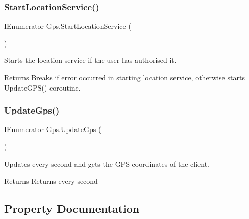 \mbox{\label{class_gps_aa67e567c766cc77fa070956e39ff9f73}} 
\subsubsection{\texorpdfstring{StartLocationService()}{StartLocationService()}}
{\footnotesize\ttfamily I\+Enumerator Gps.\+Start\+Location\+Service (\begin{DoxyParamCaption}{ }\end{DoxyParamCaption})\hspace{0.3cm}{\ttfamily [private]}}



Starts the location service if the user has authorised it. 

\begin{DoxyReturn}{Returns}
Breaks if error occurred in starting location service, otherwise starts Update\+G\+P\+S() coroutine.
\end{DoxyReturn}
\mbox{\label{class_gps_a6e153f3ff7ee313f35978f0484872f30}} 
\subsubsection{\texorpdfstring{UpdateGps()}{UpdateGps()}}
{\footnotesize\ttfamily I\+Enumerator Gps.\+Update\+Gps (\begin{DoxyParamCaption}{ }\end{DoxyParamCaption})\hspace{0.3cm}{\ttfamily [private]}}



Updates every second and gets the G\+PS coordinates of the client. 

\begin{DoxyReturn}{Returns}
Returns every second
\end{DoxyReturn}


\subsection{Property Documentation}
\mbox{\label{class_gps_aad45dcf4709abee18351879d03668108}} 
